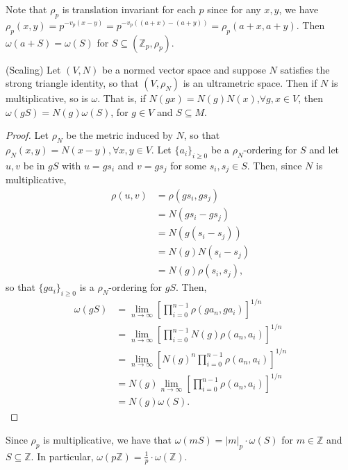 \begin{example}
	Note that $\rho_p$ is translation invariant for each $p$ since for any $x,y$, we have $\rho_p(x,y) = p^{-v_p(x-y)} = p^{-v_p((a+x)-(a+y))} = \rho_p(a+x,a+y)$. Then $\omega(a+S) = \omega(S)$ for $S \subseteq (\mathbb{Z}_p, \rho_p)$.
\end{example}

\begin{proposition}
(Scaling)	Let $(V, N)$ be a normed vector space and suppose $N$ satisfies the strong triangle identity, so that $(V,\rho_N)$ is an ultrametric space. Then if $N$ is multiplicative, so is $\omega$. That is, if $N(gx)=N(g)N(x)$,$\forall g,x \in V$, then $\omega(gS) = N(g)  \omega(S)$, for $g \in V$ and $S \subseteq M$. 
\end{proposition}

\begin{proof}
	Let $\rho_N$ be the metric induced by $N$, so that $\rho_N(x,y) = N(x-y), \forall x,y \in V$. Let $\{a_i\}_{i\geq 0}$ be a $\rho_N$-ordering for $S$ and let $u, v$ be in $gS$ with $u=gs_i$ and $v=gs_j$ for some $s_i, s_j \in S$. Then, since $N$ is multiplicative, 
	\begin{align*}
	\rho(u, v) & = \rho(gs_i, gs_j) \\
	& = N(gs_i - gs_j)  \\
	& = N(g(s_i - s_j))  \\
	& = N(g)N(s_i - s_j) \\
	& = N(g)\rho(s_i,s_j),
	\end{align*}
	so that $\{ga_i\}_{i\geq 0}$ is a $\rho_N$-ordering for $gS$. Then,
	\begin{align*}
	\omega(gS) &= \lim_{n\to\infty} [\prod_{i=0}^{n-1} \rho(ga_n,ga_i)]^{1/n} \\
	&= \lim_{n\to\infty} [\prod_{i=0}^{n-1} N(g)\rho(a_n,a_i)]^{1/n} \\
	&= \lim_{n\to\infty} [N(g)^n\prod_{i=0}^{n-1} \rho(a_n,a_i)]^{1/n}\\
	&= N(g) \lim_{n\to\infty} [\prod_{i=0}^{n-1} \rho(a_n,a_i)]^{1/n} \\
	&= N(g) \omega(S).
	\end{align*}
\end{proof}


\begin{example}
	Since $\rho_p$ is multiplicative, we have that $\omega(mS) = \lvert m \rvert_p\cdot \omega(S)$ for $m \in \mathbb{Z}$ and $S \subseteq \mathbb{Z}$. In particular, $\omega(p\mathbb{Z}) = \frac{1}{p}\cdot \omega(\mathbb{Z})$. %
\end{example}

